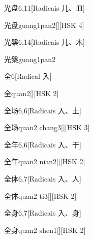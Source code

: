 \begin{entry}{光盘}{6,11}[Radicais ⼉、⽫]
  \begin{phonetics}{光盘}{guang1pan2}[][HSK 4]
  \end{phonetics}
\end{entry}

\begin{entry}{光槃}{6,14}[Radicais ⼉、⽊]
  \begin{phonetics}{光槃}{guang1pan2}
  \end{phonetics}
\end{entry}

\begin{entry}{全}{6}[Radical ⼊]
  \begin{phonetics}{全}{quan2}[][HSK 2]
  \end{phonetics}
\end{entry}

\begin{entry}{全场}{6,6}[Radicais ⼊、⼟]
  \begin{phonetics}{全场}{quan2 chang3}[][HSK 3]
  \end{phonetics}
\end{entry}

\begin{entry}{全年}{6,6}[Radicais ⼊、⼲]
  \begin{phonetics}{全年}{quan2 nian2}[][HSK 2]
  \end{phonetics}
\end{entry}

\begin{entry}{全体}{6,7}[Radicais ⼊、⼈]
  \begin{phonetics}{全体}{quan2 ti3}[][HSK 2]
  \end{phonetics}
\end{entry}

\begin{entry}{全身}{6,7}[Radicais ⼊、⾝]
  \begin{phonetics}{全身}{quan2 shen1}[][HSK 2]
  \end{phonetics}
\end{entry}

